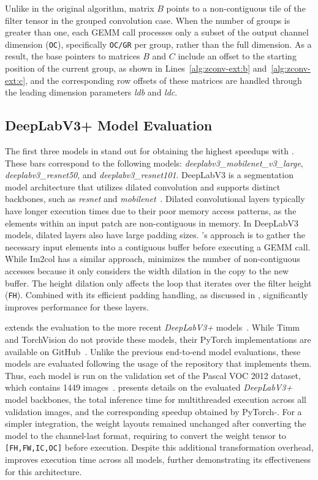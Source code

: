 Unlike in the original algorithm, matrix $B$ points to a non-contiguous tile of the filter tensor in the grouped convolution case.
When the number of groups is greater than one, each GEMM call processes only a subset of the output channel dimension (\texttt{OC}), specifically \texttt{OC/GR} per group, rather than the full dimension.
As a result, the base pointers to matrices $B$ and $C$ include an offset to the starting position of the current group, as shown in Lines~\ref{alg:zconv-ext:b} and~\ref{alg:zconv-ext:c}, and the corresponding row offsets of these matrices are handled through the leading dimension parameters \emph{ldb} and \emph{ldc}.

\subsection{DeepLabV3+ Model Evaluation}
\label{sec:deeplabv3plus}

The first three models in  stand out for obtaining the highest speedups with \algname.
These bars correspond to the following models: \emph{deeplabv3\_mobilenet\_v3\_large}, \emph{deeplabv3\_resnet50}, and \emph{deeplabv3\_resnet101}.
DeepLabV3 is a segmentation model architecture that utilizes dilated convolution and supports distinct backbones, such as \emph{resnet} and \emph{mobilenet}~\cite{Chen2017}.
Dilated convolutional layers typically have longer execution times due to their poor memory access patterns, as the elements within an input patch are non-contiguous in memory.
In DeepLabV3 models, dilated layers also have large padding sizes.
\algname's approach is to gather the necessary input elements into a contiguous buffer before executing a GEMM call.
While Im2col has a similar approach, \algname minimizes the number of non-contiguous accesses because it only considers the width dilation in the copy to the new buffer.
The height dilation only affects the loop that iterates over the filter height (\texttt{FH}).
Combined with its efficient padding handling, as discussed in , \algname significantly improves performance for these layers.

 extends the evaluation to the more recent \emph{DeepLabV3+} models~\cite{Chen2018}.
While Timm and TorchVision do not provide these models, their PyTorch implementations are available on GitHub~\cite{FangGithub}.
Unlike the previous end-to-end model evaluations, these models are evaluated following the usage of the repository that implements them.
Thus, each model is run on the validation set of the Pascal VOC 2012 dataset, which contains 1449 images~\cite{Everingham10}.
 presents details on the evaluated \emph{DeepLabV3+} model backbones, the total inference time for multithreaded execution across all validation images, and the corresponding speedup obtained by PyTorch-\algname.
For a simpler integration, the weight layouts remained unchanged after converting the model to the channel-last format, requiring \algname to convert the weight tensor to \texttt{[FH,FW,IC,OC]} before execution.
Despite this additional transformation overhead, \algname improves execution time across all models, further demonstrating its effectiveness for this architecture.

